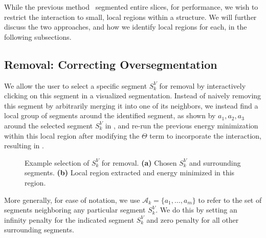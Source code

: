 \documentclass[]{spie}  %
\begin{document}
While the previous method~\cite{waggoner:11} segmented entire slices,
for performance, we wish to restrict the interaction to small, local
regions within a structure.  We will further discuss the two
approaches, and how we identify local regions for each, in the
following subsections.

\subsection{Removal: Correcting Oversegmentation}
\label{sec:remove}

We allow the user to select a specific segment $S^V_k$ for removal by
interactively clicking on this segment in a visualized segmentation.
Instead of naively removing this segment by arbitrarily merging it
into one of its neighbors, we instead find a local group of segments
around the identified segment, as shown by $a_1, a_2, a_3$ around the
selected segment $S^V_k$ in , and re-run the
previous energy minimization within this local region after modifying
the $\Theta$ term to incorporate the interaction, resulting in
.
\begin{figure}[htbp]
\centering
{}
\hspace{0.1em}
\caption{Example selection of $S^V_k$ for removal.  \textbf{(a)}
  Chosen $S^V_k$ and surrounding segments.  \textbf{(b)} Local region
  extracted and energy minimized in this
  region.} \label{fig:removal-ex}
\end{figure}
More generally, for ease of notation, we use $ \mathcal{A}_k = \{a_1,
\ldots, a_m\} $ to refer to the set of segments neighboring any
particular segment $S^V_k$.  We do this by setting an infinity penalty
for the indicated segment $S^V_k$ and zero penalty for all other
surrounding segments.
\end{document}
